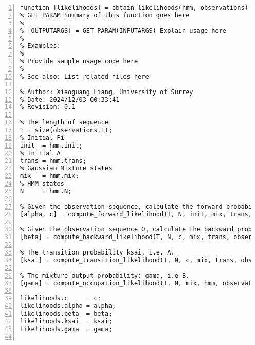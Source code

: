\documentclass{article}
\begin{document}
\begin{lstlisting}[frame=single, numbers=left, style=Matlab-editor, caption={obtain\_likelihoods.m}, label={lst:obtain_likelihoods}]
  function [likelihoods] = obtain_likelihoods(hmm, observations)
% GET_PARAM Summary of this function goes here
%
% [OUTPUTARGS] = GET_PARAM(INPUTARGS) Explain usage here
%
% Examples:
%
% Provide sample usage code here
%
% See also: List related files here

% Author: Xiaoguang Liang, University of Surrey
% Date: 2024/12/03 00:33:41
% Revision: 0.1

% The length of sequence
T = size(observations,1);
% Initial Pi
init  = hmm.init;
% Initial A
trans = hmm.trans;
% Gaussian Mixture states
mix   = hmm.mix;
% HMM states
N     = hmm.N;

% Given the observation sequence, calculate the forward probability.
[alpha, c] = compute_forward_likelihood(T, N, init, mix, trans, observations);

% Given the observation sequence O, calculate the backward probabilities beta.
[beta] = compute_backward_likelihood(T, N, c, mix, trans, observations);

% The transition probability ksai, i.e. A.
[ksai] = compute_transition_likelihood(T, N, c, mix, trans, observations, alpha, beta);

% The mixture output probability: gama, i.e B.
[gama] = compute_occupation_likelihood(T, N, mix, hmm, observations, alpha, beta);

likelihoods.c     = c;
likelihoods.alpha = alpha;
likelihoods.beta  = beta;
likelihoods.ksai  = ksai;
likelihoods.gama  = gama;


\end{lstlisting}
\end{document}

